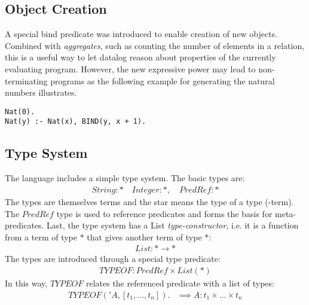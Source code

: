 \subsection{Object Creation}
A special bind predicate was introduced to enable creation of new objects. Combined with \textit{aggregates}, such as counting the number of elements in a relation, this is a useful way to let datalog reason about properties of the currently evaluating program. However, the new expressive power may lead to non-terminating programs as the following example for generating the natural numbers illustrates. 

\begin{verbatim}
Nat(0).
Nat(y) :- Nat(x), BIND(y, x + 1).
\end{verbatim}
\noindent

\subsection{Type System}
The language includes a simple type system. The basic types are:
\begin{align*}
	String : * \quad Integer : *, \quad PredRef : * 
\end{align*}
\noindent
The types are themselves terms and the star means the type of a type (-term). The $PredRef$ type is used to reference predicates and forms the basis for meta-predicates. Last, the type system has a List \textit{type-constructor}, i.e. it is a function from a term of type $*$ that gives another term of type $*$:
\begin{align*}
	List : * \rightarrow *
\end{align*}
\noindent
The types are introduced through a special type predicate:
\begin{align*}
	TYPEOF : PredRef \times List(*)
\end{align*}
In this way, $TYPEOF$ relates the referenced predicate with a list of types:
\begin{align*}
TYPEOF('A, [t_1, \ldots, t_n]). &\implies A : t_1 \times \ldots \times t_n\\
\end{align*}
\vspace*{-\baselineskip}\vspace*{-\baselineskip}\vspace*{-\baselineskip}
